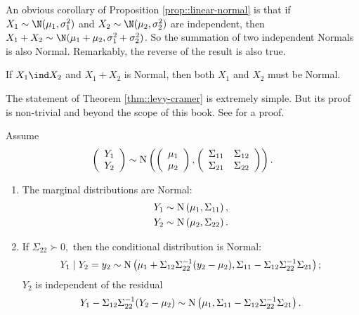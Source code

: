 An obvious corollary of Proposition \ref{prop::linear-normal} is that if $X_1 \sim \N(\mu_1, \sigma_1^2)$ and $X_2 \sim \N(\mu_2, \sigma_2^2)$ are independent, then $X_1+X_2 \sim \N(  \mu_1 + \mu_2,  \sigma_1^2 + \sigma_2^2 )$. So the summation of two independent Normals is also Normal. Remarkably, the reverse of the result is also true. 

\begin{theorem}
\label{thm::levy-cramer}
 If $X_1 \ind X_2$ and $X_1 + X_2$ is Normal, then both $X_1$ and $X_2$ must be Normal.
\end{theorem}


The statement of Theorem \ref{thm::levy-cramer} is extremely simple. But its proof is non-trivial and beyond the scope of this book. See \citet{benhamou2018three} for a proof. 



\begin{theorem}
Assume 
\[
\left(\begin{array}{c}
Y_{1}\\
Y_{2}
\end{array}\right)\sim\textup{N}\left(\left(\begin{array}{c}
\mu_{1}\\
\mu_{2}
\end{array}\right),\left(\begin{array}{cc}
\Sigma_{11} & \Sigma_{12}\\
\Sigma_{21} & \Sigma_{22}
\end{array}\right)\right).
\]
\begin{enumerate}
\item The marginal distributions are Normal:
\begin{align*}
Y_{1} & \sim\textup{N}\left(\mu_{1},\Sigma_{11}\right),\\
Y_{2} & \sim\textup{N}\left(\mu_{2},\Sigma_{22}\right).
\end{align*}
\item If $\Sigma_{22}\succ0,$ then the conditional distribution is Normal:
\[
Y_{1}\mid Y_{2}=y_{2}\sim\textup{N}\left(\mu_{1}+\Sigma_{12}\Sigma_{22}^{-1}(y_{2}-\mu_{2}),\Sigma_{11}-\Sigma_{12}\Sigma_{22}^{-1}\Sigma_{21}\right);
\]
$Y_{2}$ is independent of the residual 
\[
Y_{1}-\Sigma_{12}\Sigma_{22}^{-1}(Y_{2}-\mu_{2})\sim\textup{N}\left(\mu_{1},\Sigma_{11}-\Sigma_{12}\Sigma_{22}^{-1}\Sigma_{21}\right).
\]
\end{enumerate}
\end{theorem}



